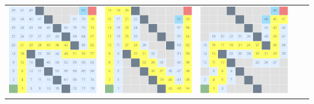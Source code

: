 \documentclass{article}
\begin{document}
\begin{center}
\begin{tabular}{c c c c c}
\includegraphics[scale=0.15]{images/scr5.png} &
\includegraphics[scale=0.15]{images/scr6.png} &
\includegraphics[scale=0.15]{images/scr7.png} &

\end{tabular}
\end{center}
\end{document}
